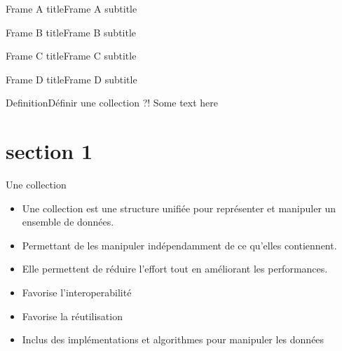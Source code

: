 





\begin{frame}[plain]
	\titlepage{}
\end{frame}

%
%

\begin{frameA}{Frame A title}{Frame A subtitle}
\end{frameA}

\begin{frameB}{Frame B title}{Frame B subtitle}
\end{frameB}

\begin{frameC}{Frame C title}{Frame C subtitle}
\end{frameC}

\begin{frameD}{Frame D title}{Frame D subtitle}
\end{frameD}

\begin{frameB}{Definition}{Définir une collection ?!}
Some text here
\end{frameB}

\section{section 1}
\begin{frame}{Une collection}
    \begin{itemize}
        \item Une collection est une structure unifiée pour représenter et manipuler un ensemble de données.
        \item Permettant de les manipuler indépendamment de ce qu'elles contiennent.
        \item Elle permettent de réduire l'effort tout en améliorant les performances\footnotemark.
        \item Favorise l'interoperabilité
        \item Favorise la réutilisation
        \item Inclus des implémentations et algorithmes pour manipuler les données
    \end{itemize}

\end{frame}

